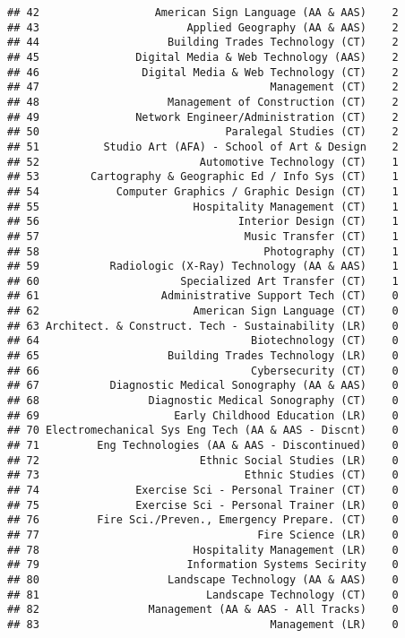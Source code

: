 \documentclass[]{article}
\begin{document}
\begin{verbatim}
## 42                  American Sign Language (AA & AAS)    2
## 43                       Applied Geography (AA & AAS)    2
## 44                    Building Trades Technology (CT)    2
## 45               Digital Media & Web Technology (AAS)    2
## 46                Digital Media & Web Technology (CT)    2
## 47                                    Management (CT)    2
## 48                    Management of Construction (CT)    2
## 49               Network Engineer/Administration (CT)    2
## 50                             Paralegal Studies (CT)    2
## 51          Studio Art (AFA) - School of Art & Design    2
## 52                         Automotive Technology (CT)    1
## 53        Cartography & Geographic Ed / Info Sys (CT)    1
## 54            Computer Graphics / Graphic Design (CT)    1
## 55                        Hospitality Management (CT)    1
## 56                               Interior Design (CT)    1
## 57                                Music Transfer (CT)    1
## 58                                   Photography (CT)    1
## 59           Radiologic (X-Ray) Technology (AA & AAS)    1
## 60                      Specialized Art Transfer (CT)    1
## 61                   Administrative Support Tech (CT)    0
## 62                        American Sign Language (CT)    0
## 63 Architect. & Construct. Tech - Sustainability (LR)    0
## 64                                 Biotechnology (CT)    0
## 65                    Building Trades Technology (LR)    0
## 66                                 Cybersecurity (CT)    0
## 67           Diagnostic Medical Sonography (AA & AAS)    0
## 68                 Diagnostic Medical Sonography (CT)    0
## 69                     Early Childhood Education (LR)    0
## 70 Electromechanical Sys Eng Tech (AA & AAS - Discnt)    0
## 71         Eng Technologies (AA & AAS - Discontinued)    0
## 72                         Ethnic Social Studies (LR)    0
## 73                                Ethnic Studies (CT)    0
## 74               Exercise Sci - Personal Trainer (CT)    0
## 75               Exercise Sci - Personal Trainer (LR)    0
## 76         Fire Sci./Preven., Emergency Prepare. (CT)    0
## 77                                  Fire Science (LR)    0
## 78                        Hospitality Management (LR)    0
## 79                       Information Systems Secirity    0
## 80                    Landscape Technology (AA & AAS)    0
## 81                          Landscape Technology (CT)    0
## 82                 Management (AA & AAS - All Tracks)    0
## 83                                    Management (LR)    0

\end{verbatim}
\end{document}

